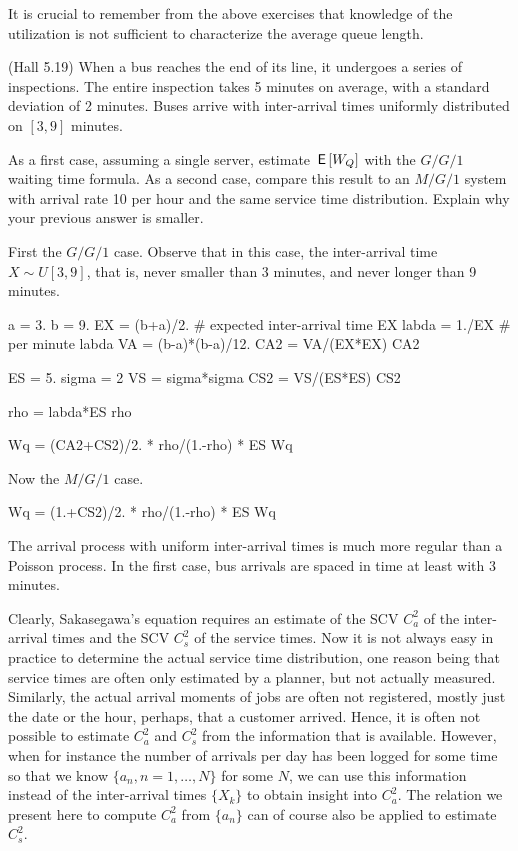 It is crucial to remember from the above exercises that knowledge of the utilization is not sufficient to characterize the average queue length.


\begin{exercise}
  (Hall 5.19) When a bus reaches the end of its line, it undergoes a series of inspections.
  The entire inspection takes 5 minutes on average, with a standard deviation of 2 minutes.
  Buses arrive with inter-arrival times uniformly distributed on $[3,9]$ minutes.

  As a first case, assuming a single server, estimate $\,\mathsf{E}\left[W_Q\right]$ with the $G/G/1$ waiting time formula.
  As a second case, compare this result to an $M/G/1$ system with arrival rate 10 per hour and the same service time distribution.
  Explain why your previous answer is smaller.
\begin{solution}
First the $G/G/1$ case. Observe that in this case, the inter-arrival time $X\sim U[3,9]$, that is, never smaller than 3 minutes, and never longer than 9 minutes. 

\begin{pyconsole}
a = 3.
b = 9. 
EX = (b+a)/2. # expected inter-arrival time
EX
labda = 1./EX # per minute
labda
VA = (b-a)*(b-a)/12.
CA2 = VA/(EX*EX)
CA2

ES = 5.
sigma = 2
VS = sigma*sigma
CS2 = VS/(ES*ES)
CS2

rho = labda*ES
rho

Wq = (CA2+CS2)/2. * rho/(1.-rho) * ES
Wq
\end{pyconsole}

Now the $M/G/1$ case.

\begin{pyconsole}
Wq = (1.+CS2)/2. * rho/(1.-rho) * ES
Wq
\end{pyconsole}

The arrival process with uniform inter-arrival times is much more regular than a Poisson process.
In the first case, bus arrivals are spaced in time at least with 3 minutes.
\end{solution}
\end{exercise}



Clearly, Sakasegawa's equation requires an estimate of the SCV $C_a^2$ of the inter-arrival times and the SCV $C_s^2$ of the service times.
Now it is not always easy in practice to determine the actual service time distribution, one reason being that service times are often only estimated by a planner, but not actually measured.
Similarly, the actual arrival moments of jobs are often not registered, mostly just the date or the hour, perhaps, that a customer arrived.
Hence, it is often not possible to estimate $C_a^2$ and $C_s^2$ from the information that is available.
However, when for instance the number of arrivals per day has been logged for some time so that we know $\{a_n, n=1,\ldots, N\}$ for some $N$, we can use this information instead of the inter-arrival times $\{X_k\}$ to obtain insight into $C_a^2$.
The relation we present here to compute $C_a^2$ from $\{a_n\}$ can of course also be applied to estimate $C_s^2$.

